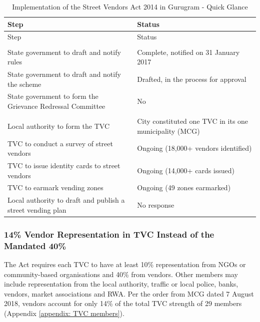 \documentclass[a4paper, 12pt, twoside]{article}
\begin{document}
{\begin{longtable}[l]{>{\raggedright}p{7cm}>{\raggedright\arraybackslash}p{7.5cm}}
  \caption{Implementation of the Street Vendors Act 2014 in Gurugram - Quick Glance}\\
    \toprule
    Step & Status\\
    \midrule
    \endfirsthead
    Step & Status\\
    \midrule
    \endhead
    \endfoot
    \endlastfoot
    \multicolumn{2}{p{36.055em}}{Haryana} \\
    \rowcolor{SVACgreen2}State government to draft and notify rules & Complete, notified on 31 January 2017 \\
    \rowcolor{SVACyellow2} State government to draft and notify the scheme & Drafted, in the process for approval \\
    \rowcolor{SVACred2} State government to form the Grievance Redressal Committee & No \\
    \midrule
    \multicolumn{2}{p{36.055em}}{Gurugram}\\
    \midrule
    \rowcolor{SVACgreen2} Local authority to form the TVC & City constituted one TVC in its one municipality (MCG) \\
      \rowcolor{SVACyellow2} TVC to conduct a survey of street vendors & Ongoing (18,000+ vendors identified) \\ %
    \rowcolor{SVACyellow2} TVC to issue identity cards to street vendors & Ongoing (14,000+ cards issued) \\ %
    \rowcolor{SVACyellow2}TVC to earmark vending zones & Ongoing (49 zones earmarked) \\
    \rowcolor{SVACred2} Local authority to draft and publish a street vending plan & No response \\
    \bottomrule
\end{longtable}

\subsubsection*{14\% Vendor Representation in TVC Instead of the Mandated 40\%} 


The Act requires each TVC to have at least 10\% representation from NGOs or community-based organisations and 40\% from vendors. Other members may include representation from the local authority, traffic or local police, banks, vendors, market associations and RWA. Per the order from MCG dated 7 August 2018, vendors account for only 14\% of the total TVC strength of 29 members (Appendix \ref{appendix: TVC members}).

}
\end{document}
